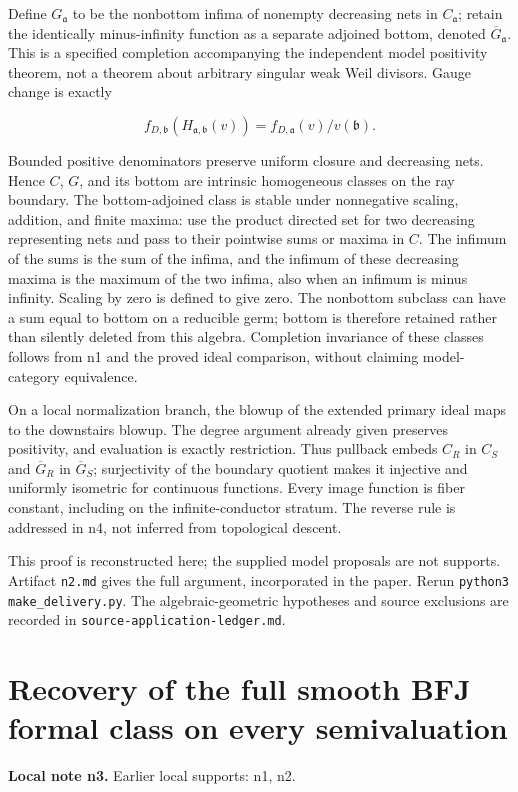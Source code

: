 \documentclass[11pt]{article}
\begin{document}
Define $G_{\mathfrak a}$ to be the nonbottom infima of nonempty decreasing nets in $C_{\mathfrak a}$; retain the identically minus-infinity function as a separate adjoined bottom, denoted $\overline G_{\mathfrak a}$. This is a specified completion accompanying the independent model positivity theorem, not a theorem about arbitrary singular weak Weil divisors. Gauge change is exactly

\[
f_{D,\mathfrak b}(H_{\mathfrak a,\mathfrak b}(v))=f_{D,\mathfrak a}(v)/v(\mathfrak b).
\]

Bounded positive denominators preserve uniform closure and decreasing nets. Hence $C$, $G$, and its bottom are intrinsic homogeneous classes on the ray boundary. The bottom-adjoined class is stable under nonnegative scaling, addition, and finite maxima: use the product directed set for two decreasing representing nets and pass to their pointwise sums or maxima in $C$. The infimum of the sums is the sum of the infima, and the infimum of these decreasing maxima is the maximum of the two infima, also when an infimum is minus infinity. Scaling by zero is defined to give zero. The nonbottom subclass can have a sum equal to bottom on a reducible germ; bottom is therefore retained rather than silently deleted from this algebra. Completion invariance of these classes follows from n1 and the proved ideal comparison, without claiming model-category equivalence.

On a local normalization branch, the blowup of the extended primary ideal maps to the downstairs blowup. The degree argument already given preserves positivity, and evaluation is exactly restriction. Thus pullback embeds $C_R$ in $C_S$ and $\overline G_R$ in $\overline G_S$; surjectivity of the boundary quotient makes it injective and uniformly isometric for continuous functions. Every image function is fiber constant, including on the infinite-conductor stratum. The reverse rule is addressed in n4, not inferred from topological descent.

This proof is reconstructed here; the supplied model proposals are not supports. Artifact \texttt{n2.\allowbreak{}md} gives the full argument, incorporated in the paper. Rerun \texttt{python3 make\_\allowbreak{}delivery.\allowbreak{}py}. The algebraic-geometric hypotheses and source exclusions are recorded in \texttt{source-\allowbreak{}application-\allowbreak{}ledger.\allowbreak{}md}.

\section{Recovery of the full smooth BFJ formal class on every semivaluation}
\label{sec:n3}
\noindent\textbf{Local note n3.} Earlier local supports: n1, n2.
\end{document}
